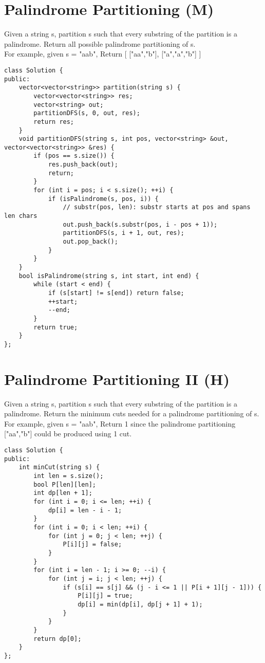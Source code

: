\section{Palindrome Partitioning (M)}
Given a string s, partition s such that every substring of the partition is a palindrome. Return all possible palindrome partitioning of s.\\

For example, given s = "aab",
Return
[
  ["aa","b"],
  ["a","a","b"]
]\\

\begin{lstlisting}
class Solution {
public:
    vector<vector<string>> partition(string s) {
        vector<vector<string>> res;
        vector<string> out;
        partitionDFS(s, 0, out, res);
        return res;
    }
    void partitionDFS(string s, int pos, vector<string> &out, vector<vector<string>> &res) {
        if (pos == s.size()) {
            res.push_back(out);
            return;
        }
        for (int i = pos; i < s.size(); ++i) {
            if (isPalindrome(s, pos, i)) {
                // substr(pos, len): substr starts at pos and spans len chars
                out.push_back(s.substr(pos, i - pos + 1));
                partitionDFS(s, i + 1, out, res);
                out.pop_back();
            }
        }
    }
    bool isPalindrome(string s, int start, int end) {
        while (start < end) {
            if (s[start] != s[end]) return false;
            ++start;
            --end;
        }
        return true;
    }
};
\end{lstlisting}


\section{Palindrome Partitioning II (H)}
Given a string s, partition s such that every substring of the partition is a palindrome. Return the minimum cuts needed for a palindrome partitioning of s. \\

For example, given s = "aab",
Return 1 since the palindrome partitioning ["aa","b"] could be produced using 1 cut. \\

\begin{lstlisting}
class Solution {
public:
    int minCut(string s) {
        int len = s.size();
        bool P[len][len];
        int dp[len + 1];
        for (int i = 0; i <= len; ++i) {
            dp[i] = len - i - 1;
        }
        for (int i = 0; i < len; ++i) {
            for (int j = 0; j < len; ++j) {
                P[i][j] = false;
            }
        }
        for (int i = len - 1; i >= 0; --i) {
            for (int j = i; j < len; ++j) {
                if (s[i] == s[j] && (j - i <= 1 || P[i + 1][j - 1])) {
                    P[i][j] = true;
                    dp[i] = min(dp[i], dp[j + 1] + 1);
                }
            }
        }
        return dp[0];
    }
};
\end{lstlisting}



